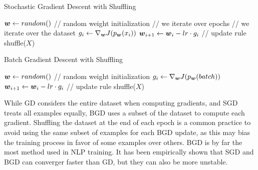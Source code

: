 \documentclass[11pt,a4paper]{article}
\begin{document}
\begin{enumerate}[label=(\alph*)]
          \begin{algorithm}
              \caption{Stochastic Gradient Descent with Shuffling}
              \label{alg:sgd_shuffled}
              \begin{algorithmic}[1]
                  \State ${\boldsymbol{w}}\leftarrow random()$ \qquad   // random weight initialization
                   \qquad   // we iterate over epochs
                   \qquad   // we iterate over the dataset
                  \State $g_i\leftarrow \nabla_{{\boldsymbol{w}}}J(p_{{\boldsymbol{w}}}(x_i))$
                  \State ${\boldsymbol{w}}_{i+1}\leftarrow {\boldsymbol{w}}_i - lr \cdot g_i$ \qquad   // update rule
                  \EndFor
                  \State shuffle($X$)
                  \EndFor
                  \EndProcedure
              \end{algorithmic}
          \end{algorithm}
          \begin{algorithm}[h!]
              \caption{Batch Gradient Descent with Shuffling}
              \label{alg:bgd_shuffled}
              \begin{algorithmic}[1]
                  \State ${\boldsymbol{w}}\leftarrow random()$ \qquad   // random weight initialization
                  \State $g_i\leftarrow \nabla_{{\boldsymbol{w}}}J(p_{{\boldsymbol{w}}}(batch))$
                  \State ${\boldsymbol{w}}_{i+1}\leftarrow {\boldsymbol{w}}_i - lr \cdot g_i$ \qquad   // update rule
                  \EndFor
                  \State shuffle($X$)
                  \EndFor
                  \EndProcedure
              \end{algorithmic}
          \end{algorithm}

          While GD considers the entire dataset when computing gradients, and 
          SGD treats all examples equally, BGD uses a subset of the dataset to 
          compute each gradient.
          Shuffling the dataset at the end of each epoch is a common practice to
          avoid using the same subset of examples for each BGD update, as this 
          may bias the training process in favor of some examples over others.
          BGD is by far the most method used in NLP training. It has been
          empirically shown that SGD and BGD can converger faster than GD, but
          they can also be more unstable.
\end{enumerate}
\end{document}
